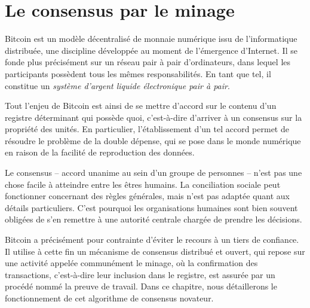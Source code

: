 
\chapter{Le consensus par le minage}
\label{ch:8}

Bitcoin est un modèle décentralisé de monnaie numérique issu de l'informatique distribuée, une discipline développée au moment de l'émergence d'Internet. Il se fonde plus précisément sur un réseau pair à pair d'ordinateurs, dans lequel les participants possèdent tous les mêmes responsabilités. En tant que tel, il constitue un \emph{système d'argent liquide électronique pair à pair}.

Tout l'enjeu de Bitcoin est ainsi de se mettre d'accord sur le contenu d'un registre déterminant qui possède quoi, c'est-à-dire d'arriver à un consensus sur la propriété des unités. En particulier, l'établissement d'un tel accord permet de résoudre le problème de la double dépense, qui se pose dans le monde numérique en raison de la facilité de reproduction des données.

Le consensus -- accord unanime au sein d'un groupe de personnes -- n'est pas une chose facile à atteindre entre les êtres humains. La conciliation sociale peut fonctionner concernant des règles générales, mais n'est pas adaptée quant aux détails particuliers. C'est pourquoi les organisations humaines sont bien souvent obligées de s'en remettre à une autorité centrale chargée de prendre les décisions.

Bitcoin a précisément pour contrainte d'éviter le recours à un tiers de confiance. Il utilise à cette fin un mécanisme de consensus distribué et ouvert, qui repose sur une activité appelée communément le minage, où la confirmation des transactions, c'est-à-dire leur inclusion dans le registre, est assurée par un procédé nommé la preuve de travail. Dans ce chapitre, nous détaillerons le fonctionnement de cet algorithme de consensus novateur.



